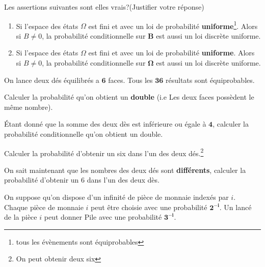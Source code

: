 \documentclass[11pt,largemargins]{homework}
\begin{document}
\maketitle

Les assertions suivantes sont elles vrais?(Justifier votre réponse)

\begin{enumerate}
    \item Si l'espace des états $\Omega$ est fini et avec un loi de probabilité
        \textbf{uniforme}\footnote {tous les évènements sont équiprobables}. Alors si $B \neq 0$, la probabilité conditionnelle sur
        $\mathbf{B}$ est aussi un loi discrète uniforme.

    \item Si l'espace des états $\Omega$ est fini et avec un loi de probabilité
        \textbf{uniforme}. Alors si $B \neq 0$, la probabilité conditionnelle sur
        $\mathbf{\Omega}$ est aussi un loi discrète uniforme.
\end{enumerate}


On lance deux  dés équilibrés a $\mathbf{6}$ faces. Tous les $\mathbf{36}$
résultats sont équiprobables.\\

\begin{arabicparts}
    \item Calculer la probabilité qu'on obtient un \textbf{double} (i.e Les deux
    faces possèdent le même nombre).
\item Étant donné que la somme des deux dès est inférieure ou
    égale à $\mathbf{4}$, calculer la probabilité conditionnelle qu'on obtient un
    double.

\item Calculer la probabilité d'obtenir un six dans l'un des deux
    dés.\footnote{On peut obtenir deux six}
\item On sait maintenant que les nombres des deux dés sont \textbf{différents},
    calculer la probabilité d'obtenir un $6$ dans l'un des deux dès.

\end{arabicparts}

On suppose qu'on dispose d'un infinité de pièce de monnaie indexés par $i$.
Chaque pièce de monnaie $i$ peut être choisie avec une probabilité
$\mathbf{2^{-i}}$. Un lancé de la pièce $i$ peut donner Pile avec une
probabilité $\mathbf{3^{-i}}$.\\[4pt]
\end{document}
